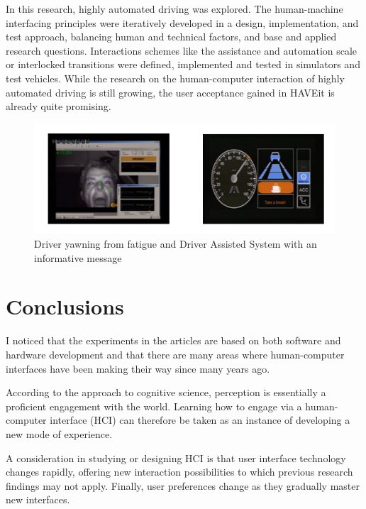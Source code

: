 \documentclass[12pt, twoside]{article}
\begin{document}
In this research, highly automated driving was explored. The human-machine interfacing principles were iteratively developed in a design, implementation, and test approach, balancing human and technical factors, and base and applied research questions. Interactions schemes like the assistance and automation scale or interlocked transitions were defined, implemented and tested in simulators and test vehicles. While the research on the human-computer interaction of highly automated driving is still growing, the user acceptance gained in HAVEit is already quite promising.

\begin{figure}[!h]
    \centering
    \includegraphics[width=0.7\linewidth]{photo2}
    \caption{Driver yawning from fatigue and Driver Assisted System with an informative message}
\end{figure}

\section{Conclusions}
I noticed that the experiments in the articles are based on both software and hardware development and that there are many areas where human-computer interfaces have been making their way since many years ago.

According to the approach to cognitive science, perception is essentially a proficient engagement with the world. Learning how to engage via a human-computer interface (HCI) can therefore be taken as an instance of developing a new mode of experience.

A consideration in studying or designing HCI is that user interface technology changes rapidly, offering new interaction possibilities to which previous research findings may not apply. Finally, user preferences change as they gradually master new interfaces.
\end{document}
